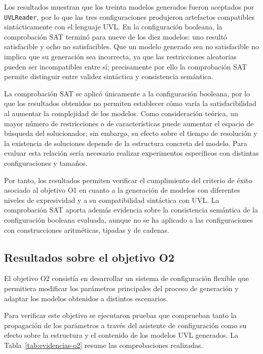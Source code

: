 Los resultados muestran que los treinta modelos generados fueron aceptados por
\texttt{UVLReader}, por lo que las tres configuraciones produjeron artefactos
compatibles sintácticamente con el lenguaje UVL. En la configuración booleana,
la comprobación SAT terminó para nueve de los diez modelos: uno resultó
satisfacible y ocho no satisfacibles. Que un modelo generado sea no satisfacible
no implica que su generación sea incorrecta, ya que las restricciones aleatorias
pueden ser incompatibles entre sí; precisamente por ello la comprobación SAT
permite distinguir entre validez sintáctica y consistencia semántica.

La comprobación SAT se aplicó únicamente a la configuración booleana, por lo
que los resultados obtenidos no permiten establecer cómo varía la
satisfacibilidad al aumentar la complejidad de los modelos. Como consideración
teórica, un mayor número de restricciones o de características puede aumentar
el espacio de búsqueda del solucionador; sin embargo, su efecto sobre el
tiempo de resolución y la existencia de soluciones depende de la estructura
concreta del modelo. Para evaluar esta relación sería necesario realizar
experimentos específicos con distintas configuraciones y tamaños.

Por tanto, los resultados permiten verificar el cumplimiento del criterio de
éxito asociado al objetivo O1 en cuanto a la generación de modelos con
diferentes niveles de expresividad y a su compatibilidad sintáctica con UVL.
La comprobación SAT aporta además evidencia sobre la consistencia semántica de
la configuración booleana evaluada, aunque no se ha aplicado a las
configuraciones con construcciones aritméticas, tipadas y de cadenas.

\subsection{Resultados sobre el objetivo O2}
\label{subsec:resultados_o2}

El objetivo O2 consistía en desarrollar un sistema de configuración flexible
que permitiera modificar los parámetros principales del proceso de generación
y adaptar los modelos obtenidos a distintos escenarios.

Para verificar este objetivo se ejecutaron pruebas que comprueban tanto la
propagación de los parámetros a través del asistente de configuración como su
efecto sobre la estructura y el contenido de los modelos UVL generados. La
Tabla~\ref{tab:evidencias-o2} resume las comprobaciones realizadas.

